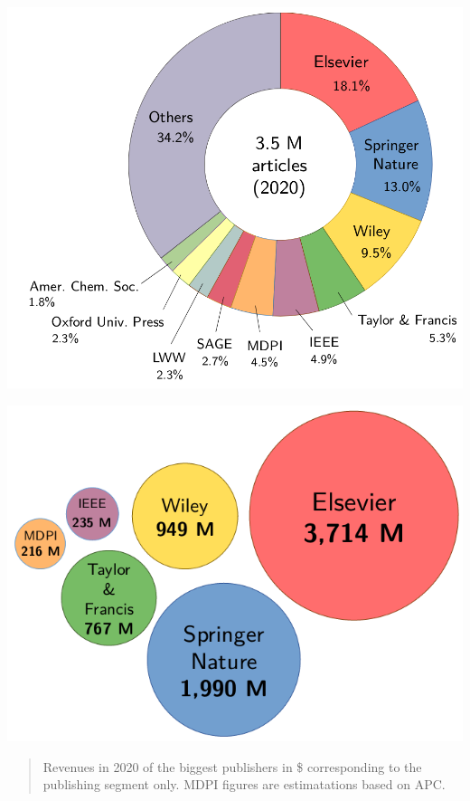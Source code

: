 \documentclass[10pt,compress,serif,aspectratio=169]{beamer}
\begin{document}

\begin{frame}[t]%
 \vskip1cm%
\includegraphics[width=.8\textwidth]{publisher-shares}
\end{frame}


\begin{frame}[t]%
 \vskip1cm%
 \includegraphics[width=.6\textwidth]{publishers-revenues}
 \begin{quote}
   Revenues in 2020 of the biggest publishers in \$ corresponding to the publishing segment only. MDPI figures are estimatations based on APC.
 \end{quote}
\end{frame}

\end{document}
